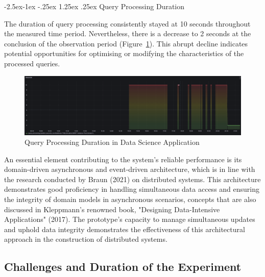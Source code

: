 \documentclass[review]{elsarticle}
\makeatletter
\renewcommand\paragraph{\@startsection{paragraph}{4}{\z@}%
            {-2.5ex\@plus -1ex \@minus -.25ex}%
            {1.25ex \@plus .25ex}%
            {\normalfont\normalsize\itshape}}
\makeatother
\begin{document}
\paragraph{Query Processing Duration}

The duration of query processing consistently stayed at 10 seconds throughout the measured time period. Nevertheless, there is a decrease to 2 seconds at the conclusion of the observation period (Figure~\ref{queryProcessingDurationInDataScienceApplication}). This abrupt decline indicates potential opportunities for optimising or modifying the characteristics of the processed queries.

\begin{figure}[ht]

  \centering

  \includegraphics[width=\textwidth]{images/query-processing-duration-in-data-science-application.png}

  \caption{Query Processing Duration in Data Science Application}

  \label{queryProcessingDurationInDataScienceApplication}

\end{figure}

An essential element contributing to the system's reliable performance is its domain-driven asynchronous and event-driven architecture, which is in line with the research conducted by Braun (2021) on distributed systems. This architecture demonstrates good proficiency in handling simultaneous data access and ensuring the integrity of domain models in asynchronous scenarios, concepts that are also discussed in Kleppmann's renowned book, "Designing Data-Intensive Applications" (2017). The prototype's capacity to manage simultaneous updates and uphold data integrity demonstrates the effectiveness of this architectural approach in the construction of distributed systems.

\subsection{Challenges and Duration of the Experiment}
\end{document}
